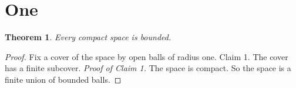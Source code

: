 \documentclass{article}
\newtheorem{thm}{Theorem}
\begin{document}
\section{One}
\begin{thm} Every compact space is bounded. \end{thm}
\begin{proof} Fix a cover of the space by open balls of radius one.
\newline\textsf{Claim 1.}
The cover has a finite subcover.
\newline\textit{Proof of Claim 1.}
The space is compact. So the space is a finite union of bounded balls.
\end{proof}
\end{document}
